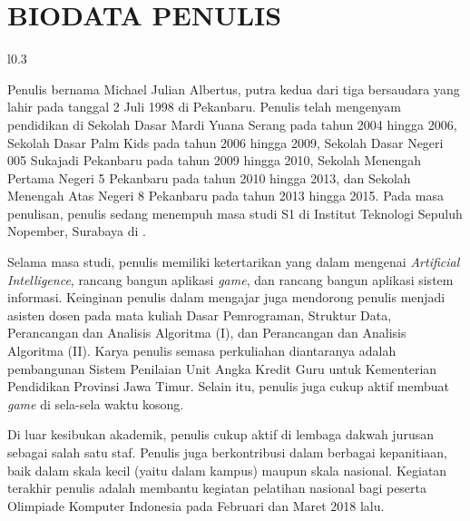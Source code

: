 \chapter{BIODATA PENULIS}

\begin{wrapfigure}{l}{0.3\textwidth}
\end{wrapfigure}

Penulis bernama Michael Julian Albertus, putra kedua dari tiga bersaudara yang lahir pada tanggal 2 Juli 1998 di Pekanbaru. Penulis telah mengenyam pendidikan di Sekolah Dasar Mardi Yuana Serang pada tahun 2004 hingga 2006, Sekolah Dasar Palm Kids pada tahun 2006 hingga 2009, Sekolah Dasar Negeri 005 Sukajadi Pekanbaru pada tahun 2009 hingga 2010, Sekolah Menengah Pertama Negeri 5 Pekanbaru pada tahun 2010 hingga 2013, dan Sekolah Menengah Atas Negeri 8 Pekanbaru pada tahun 2013 hingga 2015. Pada masa penulisan, penulis sedang menempuh masa studi S1 di Institut Teknologi Sepuluh Nopember, Surabaya di \jurusan.

Selama masa studi, penulis memiliki ketertarikan yang dalam mengenai \textit{Artificial Intelligence}, rancang bangun aplikasi \textit{game}, dan rancang bangun aplikasi sistem informasi. Keinginan penulis dalam mengajar juga mendorong penulis menjadi asisten dosen pada mata kuliah Dasar Pemrograman, Struktur Data, Perancangan dan Analisis Algoritma (I), dan Perancangan dan Analisis Algoritma (II). Karya penulis semasa perkuliahan diantaranya adalah pembangunan Sistem Penilaian Unit Angka Kredit Guru untuk Kementerian Pendidikan Provinsi Jawa Timur. Selain itu, penulis juga cukup aktif membuat \textit{game} di sela-sela waktu kosong.

Di luar kesibukan akademik, penulis cukup aktif di lembaga dakwah jurusan sebagai salah satu staf. Penulis juga berkontribusi dalam berbagai kepanitiaan, baik dalam skala kecil (yaitu dalam kampus) maupun skala nasional. Kegiatan terakhir penulis adalah membantu kegiatan pelatihan nasional bagi peserta Olimpiade Komputer Indonesia pada Februari dan Maret 2018 lalu.

